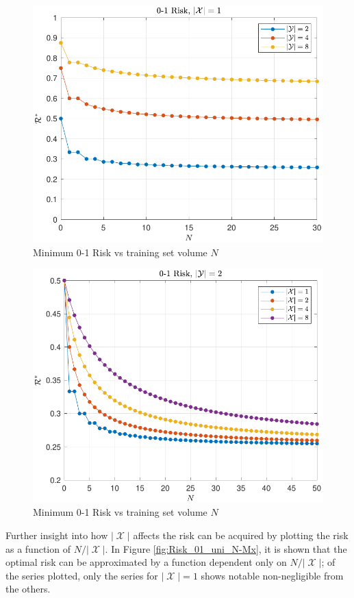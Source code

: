\documentclass[12pt]{article}
\DeclareMathOperator{\Xcal}{\mathcal{X}}
\begin{document}
\begin{figure}
\centering
\includegraphics[width=0.7\linewidth]{Risk_01_uni_N_leg_My.pdf}
\caption{Minimum 0-1 Risk vs training set volume $N$}
\label{fig:Risk_01_uni_N_leg_My}
\end{figure}

\begin{figure}
\centering
\includegraphics[width=0.7\linewidth]{Risk_01_uni_N_leg_Mx.pdf}
\caption{Minimum 0-1 Risk vs training set volume $N$}
\label{fig:Risk_01_uni_N_leg_Mx}
\end{figure}

Further insight into how $|\Xcal|$ affects the risk can be acquired by plotting the risk as a function of $N/|\Xcal|$. In Figure \ref{fig:Risk_01_uni_N-Mx}, it is shown that the optimal risk can be approximated by a function dependent only on $N/|\Xcal|$; of the series plotted, only the series for $|\Xcal| = 1$ shows notable non-negligible from the others.
\end{document}
